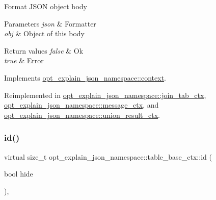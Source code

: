 Format J\+S\+ON object body


\begin{DoxyParams}{Parameters}
{\em json} & Formatter \\
\hline
{\em obj} & Object of this body\\
\hline
\end{DoxyParams}

\begin{DoxyRetVals}{Return values}
{\em false} & Ok \\
\hline
{\em true} & Error \\
\hline
\end{DoxyRetVals}


Implements \mbox{\hyperlink{classopt__explain__json__namespace_1_1context}{opt\+\_\+explain\+\_\+json\+\_\+namespace\+::context}}.



Reimplemented in \mbox{\hyperlink{classopt__explain__json__namespace_1_1join__tab__ctx_a74c2ce48b173e41e0878b549ea44e4b0}{opt\+\_\+explain\+\_\+json\+\_\+namespace\+::join\+\_\+tab\+\_\+ctx}}, \mbox{\hyperlink{classopt__explain__json__namespace_1_1message__ctx_aaad801a247c7103078a058661f4084ce}{opt\+\_\+explain\+\_\+json\+\_\+namespace\+::message\+\_\+ctx}}, and \mbox{\hyperlink{classopt__explain__json__namespace_1_1union__result__ctx_a530209b64dc40a9e682f78cd550b1047}{opt\+\_\+explain\+\_\+json\+\_\+namespace\+::union\+\_\+result\+\_\+ctx}}.

\mbox{\label{classopt__explain__json__namespace_1_1table__base__ctx_afc1c98638ff3c4cc5b33ef99164cb144}} 
\subsubsection{\texorpdfstring{id()}{id()}}
{\footnotesize\ttfamily virtual size\+\_\+t opt\+\_\+explain\+\_\+json\+\_\+namespace\+::table\+\_\+base\+\_\+ctx\+::id (\begin{DoxyParamCaption}\item[{bool}]{hide }\end{DoxyParamCaption})\hspace{0.3cm}{\ttfamily [inline]}, {\ttfamily [virtual]}}

